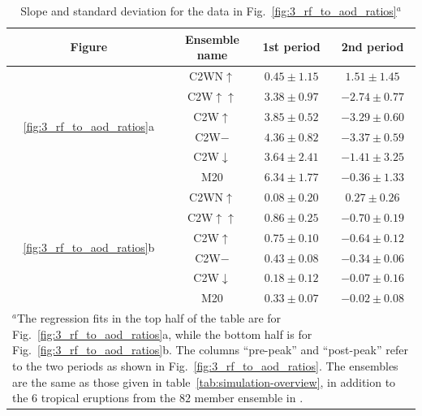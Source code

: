 \documentclass[draft]{agujournal2019}
\begin{document}
\begin{table}
  \centering

  \caption{Slope and standard deviation for the data in
    Fig.~\ref{fig:3_rf_to_aod_ratios}\(^{a}\)}\label{tab:slope-gradients}%
  \begin{tabular}{cccc}
    \toprule
    Figure                                         & Ensemble name           & 1st period      & 2nd period       \\
    \midrule
                                                   & C2WN\(\uparrow\)        & \(0.45\pm1.15\) & \(1.51\pm1.45\)  \\
                                                   & C2W\(\uparrow\uparrow\) & \(3.38\pm0.97\) & \(-2.74\pm0.77\) \\
    \multirow{2}{*}{\ref{fig:3_rf_to_aod_ratios}a} & C2W\(\uparrow\)         & \(3.85\pm0.52\) & \(-3.29\pm0.60\) \\
                                                   & C2W\(-\)                & \(4.36\pm0.82\) & \(-3.37\pm0.59\) \\
                                                   & C2W\(\downarrow\)       & \(3.64\pm2.41\) & \(-1.41\pm3.25\) \\
                                                   & M20                     & \(6.34\pm1.77\) & \(-0.36\pm1.33\) \\
    \midrule
                                                   & C2WN\(\uparrow\)        & \(0.08\pm0.20\) & \(0.27\pm0.26\)  \\
                                                   & C2W\(\uparrow\uparrow\) & \(0.86\pm0.25\) & \(-0.70\pm0.19\) \\
    \multirow{2}{*}{\ref{fig:3_rf_to_aod_ratios}b} & C2W\(\uparrow\)         & \(0.75\pm0.10\) & \(-0.64\pm0.12\) \\
                                                   & C2W\(-\)                & \(0.43\pm0.08\) & \(-0.34\pm0.06\) \\
                                                   & C2W\(\downarrow\)       & \(0.18\pm0.12\) & \(-0.07\pm0.16\) \\
                                                   & M20                     & \(0.33\pm0.07\) & \(-0.02\pm0.08\) \\
    \toprule
    \multicolumn{4}{l}{\parbox{\linewidth}{\(^{a}\)The regression fits in the top half of the table are for
        Fig.~\ref{fig:3_rf_to_aod_ratios}a, while the bottom half is for
        Fig.~\ref{fig:3_rf_to_aod_ratios}b. The columns ``pre-peak'' and ``post-peak'' refer to
        the two periods as shown in Fig.~\ref{fig:3_rf_to_aod_ratios}. The ensembles are the
        same as those given in table~\ref{tab:simulation-overview}, in addition to the \(6\)
        tropical eruptions from the \(82\) member ensemble in
    .}}                                                                                       \\
  \end{tabular}
\end{table}
\end{document}
